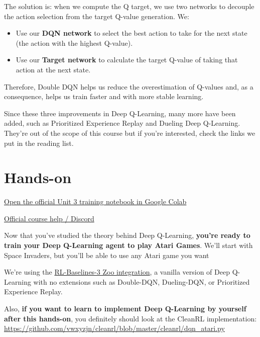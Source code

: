 \documentclass[11pt,a4paper]{article}
\begin{document}
The solution is: when we compute the Q target, we use two networks to decouple the action selection from the target Q-value generation. We:

\begin{itemize}
\tightlist
\item
  Use our \textbf{DQN network} to select the best action to take for the next state (the action with the highest Q-value).
\item
  Use our \textbf{Target network} to calculate the target Q-value of taking that action at the next state.
\end{itemize}

Therefore, Double DQN helps us reduce the overestimation of Q-values and, as a consequence, helps us train faster and with more stable learning.

Since these three improvements in Deep Q-Learning, many more have been added, such as Prioritized Experience Replay and Dueling Deep Q-Learning. They're out of the scope of this course but if you're interested, check the links we put in the reading list.

\section{Hands-on}\label{hands-on}

\href{https://colab.research.google.com/github/huggingface/deep-rl-class/blob/main/notebooks/unit3/unit3.ipynb}{Open the official Unit 3 training notebook in Google Colab}

\href{http://hf.co/join/discord}{Official course help / Discord}

Now that you've studied the theory behind Deep Q-Learning, \textbf{you're ready to train your Deep Q-Learning agent to play Atari Games}. We'll start with Space Invaders, but you'll be able to use any Atari game you want


We're using the \href{https://github.com/DLR-RM/rl-baselines3-zoo}{RL-Baselines-3 Zoo integration}, a vanilla version of Deep Q-Learning with no extensions such as Double-DQN, Dueling-DQN, or Prioritized Experience Replay.

Also, \textbf{if you want to learn to implement Deep Q-Learning by yourself after this hands-on}, you definitely should look at the CleanRL implementation: \url{https://github.com/vwxyzjn/cleanrl/blob/master/cleanrl/dqn_atari.py}
\end{document}
